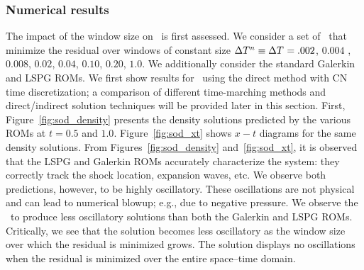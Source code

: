 \subsubsection{Numerical results}
The impact of the window size on \methodAcronymROMs\ is first assessed. We consider a set of \methodAcronymROMs\ that minimize the residual over windows of constant size 
$\Delta T^{n} \equiv \Delta T^{} =  .002$, $0.004$ ,$0.008$, $0.02$, $0.04$, $0.10$, $0.20$, $1.0$. We additionally consider the standard Galerkin and LSPG ROMs. We first show results for \methodAcronymROMs\ using the direct method with CN time discretization; a comparison of different time-marching methods and direct/indirect solution techniques will be provided later in this section. 
First, Figure~\ref{fig:sod_density} presents the density solutions predicted by the various ROMs at $t = 0.5$ and $1.0$. Figure~\ref{fig:sod_xt} shows 
$x-t$ diagrams for the same density solutions. From Figures~\ref{fig:sod_density} and~\ref{fig:sod_xt}, it is observed that the LSPG and Galerkin ROMs accurately characterize 
the system: they correctly track the shock location, expansion waves, etc. We observe both predictions, however, to be highly oscillatory. These oscillations are 
not physical and can lead to numerical blowup; e.g., due to negative pressure. We observe the \methodAcronymROMs\ to produce less oscillatory solutions than both 
the Galerkin and LSPG ROMs. Critically, we see that the solution becomes less oscillatory as the window size over which the residual is minimized grows. The solution displays no oscillations when the residual is minimized over the entire space--time domain. 


